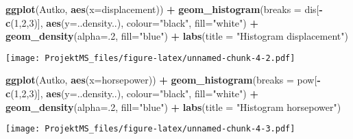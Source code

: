 \documentclass[
]{article}
\newenvironment{Shaded}{\begin{snugshade}}{\end{snugshade}}
\newcommand{\DataTypeTok}[1]{\textcolor[rgb]{0.13,0.29,0.53}{#1}}
\newcommand{\DecValTok}[1]{\textcolor[rgb]{0.00,0.00,0.81}{#1}}
\newcommand{\KeywordTok}[1]{\textcolor[rgb]{0.13,0.29,0.53}{\textbf{#1}}}
\newcommand{\NormalTok}[1]{#1}
\newcommand{\OperatorTok}[1]{\textcolor[rgb]{0.81,0.36,0.00}{\textbf{#1}}}
\newcommand{\StringTok}[1]{\textcolor[rgb]{0.31,0.60,0.02}{#1}}
\begin{document}
\begin{Shaded}
\begin{Highlighting}[]
\KeywordTok{ggplot}\NormalTok{(Autko, }\KeywordTok{aes}\NormalTok{(}\DataTypeTok{x=}\NormalTok{displacement)) }\OperatorTok{+}\StringTok{ }\KeywordTok{geom_histogram}\NormalTok{(}\DataTypeTok{breaks =}\NormalTok{ dis[}\OperatorTok{-}\KeywordTok{c}\NormalTok{(}\DecValTok{1}\NormalTok{,}\DecValTok{2}\NormalTok{,}\DecValTok{3}\NormalTok{)], }\KeywordTok{aes}\NormalTok{(}\DataTypeTok{y=}\NormalTok{..density..),  }\DataTypeTok{colour=}\StringTok{"black"}\NormalTok{, }\DataTypeTok{fill=}\StringTok{"white"}\NormalTok{) }\OperatorTok{+}\StringTok{ }\KeywordTok{geom_density}\NormalTok{(}\DataTypeTok{alpha=}\NormalTok{.}\DecValTok{2}\NormalTok{, }\DataTypeTok{fill=}\StringTok{"blue"}\NormalTok{) }\OperatorTok{+}\StringTok{ }\KeywordTok{labs}\NormalTok{(}\DataTypeTok{title =} \StringTok{"Histogram displacement"}\NormalTok{)}
\end{Highlighting}
\end{Shaded}

\texttt{[image: ProjektMS\_files/figure-latex/unnamed-chunk-4-2.pdf]}

\begin{Shaded}
\begin{Highlighting}[]
\KeywordTok{ggplot}\NormalTok{(Autko, }\KeywordTok{aes}\NormalTok{(}\DataTypeTok{x=}\NormalTok{horsepower)) }\OperatorTok{+}\StringTok{  }\KeywordTok{geom_histogram}\NormalTok{(}\DataTypeTok{breaks =}\NormalTok{ pow[}\OperatorTok{-}\KeywordTok{c}\NormalTok{(}\DecValTok{1}\NormalTok{,}\DecValTok{2}\NormalTok{,}\DecValTok{3}\NormalTok{)], }\KeywordTok{aes}\NormalTok{(}\DataTypeTok{y=}\NormalTok{..density..),  }\DataTypeTok{colour=}\StringTok{"black"}\NormalTok{, }\DataTypeTok{fill=}\StringTok{"white"}\NormalTok{) }\OperatorTok{+}\StringTok{ }\KeywordTok{geom_density}\NormalTok{(}\DataTypeTok{alpha=}\NormalTok{.}\DecValTok{2}\NormalTok{, }\DataTypeTok{fill=}\StringTok{"blue"}\NormalTok{) }\OperatorTok{+}\StringTok{ }\KeywordTok{labs}\NormalTok{(}\DataTypeTok{title =} \StringTok{"Histogram horsepower"}\NormalTok{)}
\end{Highlighting}
\end{Shaded}

\texttt{[image: ProjektMS\_files/figure-latex/unnamed-chunk-4-3.pdf]}
\end{document}
